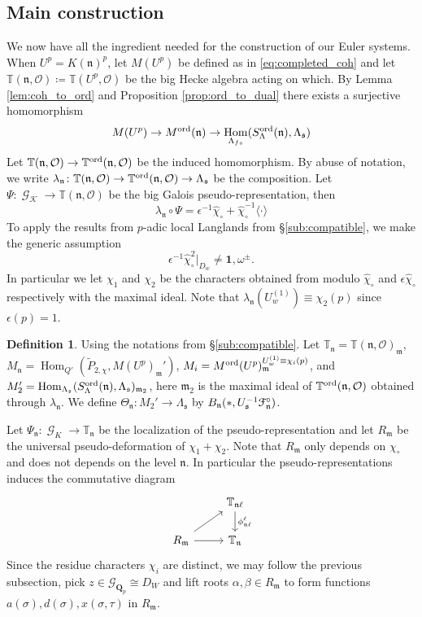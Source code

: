 \documentclass[leqno]{amsart}
\theoremstyle{definition}
\newtheorem{defn}[thm]{Definition}
\theoremstyle{remark}
\newcommand{\id}{\mathbf{1}}
\newcommand{\oo}{\mathcal{O}}
\newcommand{\Qp}{\mathbf{Q}_p}
\DeclareMathOperator{\Hom}{Hom}
\DeclareMathOperator{\Gal}{\mathcal{G}}
\newcommand{\fm}{\mathfrak{m}}
\newcommand{\fn}{\mathfrak{n}}
\newcommand{\fs}{\mathfrak{s}}
\newcommand{\Gp}{\mathcal{G}_{\Qp}} %
\newcommand{\K}{{\mathcal{K}}} %
\newcommand{\TT}{\mathbb{T}} %
\newcommand{\euF}{\EuScript{F}} %
\newcommand{\ord}{\textnormal{ord}} %
\begin{document}
\subsection{Main construction}
We now have all the ingredient needed 
for the construction of our Euler systems.
When $U^p=K(\fn)^p$,
let $M(U^p)$ be defined as in \eqref{eq:completed_coh}
and let $\TT(\fn,\oo)\coloneqq \TT(U^p,\oo)$
be the big Hecke algebra acting on which.
By Lemma \ref{lem:coh_to_ord}
and Proposition \ref{prop:ord_to_dual}
there exists a surjective homomorphism
\[
	M(U^p)\to M^{\ord}(\fn)\to 
	\Hom_{\Lambda_{fs}}(S_\Lambda^{\ord}(\fn),\Lambda_\fs)
\]
Let $\TT(\fn,\oo)\to \TT^{\ord}(\fn,\oo)$
be the induced homomorphism.
By abuse of notation, we write 
$\lambda_{\fn}\colon \TT(\fn,\oo)\to \TT^{\ord}(\fn,\oo)\to
\Lambda_{\fs}$ be the composition.
Let $\Psi\colon \Gal_\K\to \TT(\fn,\oo)$ be the 
big Galois pseudo-representation, then
\[
	\lambda_{\fn}\circ \Psi=
	\epsilon^{-1}\hat{\chi}_\circ+
	\hat{\chi}_\circ^{-1}\langle\cdot\rangle
\]
To apply the results from $p$-adic local Langlands
from \S\ref{sub:compatible},
we make the generic assumption
\begin{equation}\label{cond:chi_gen}\tag{$\chi$-gen}
\epsilon^{-1}\hat{\chi}_\circ^{2}\vert_{D_w}\neq
\id, \omega^{\pm}.
\end{equation}
In particular we let 
$\chi_1$ and  $\chi_2$ be the 
characters obtained from 
modulo 
$\hat{\chi}_\circ$ and $\epsilon\hat{\chi}_\circ$ 
respectively with the maximal ideal.
Note that $\lambda_{\fn}(U_{w}^{(1)})\equiv \chi_2(p)$
since $\epsilon(p)=1$.


\begin{defn}
	Using the notations from 
	\S\ref{sub:compatible}.
	Let $\TT_\fn=\TT(\fn,\oo)_\fm$,
	$M_\fn=\Hom_{Q'}(\tilde{P}_{2,\chi},M(U^p)_{\fm}')$,
	$M_i=M^{\ord}(U^p)_\fm^{U_{w}^{(1)}\equiv\chi_i(p)}$,
	and $M_2'=\Hom_{\Lambda_{\fs}}
	(S^{\ord}_{\Lambda}(\fn),\Lambda_{\fs})_{\fm_2}$,
	here $\fm_2$ is the maximal ideal
	of $\TT^{\ord}(\fn,\oo)$ obtained through 
	$\lambda_\fn$.
	We define 
	$\Theta_\fn\colon M_2'\to \Lambda_{\fs}$
	by $B_\fn(*,U_\fs^{-1}\euF^\circ_\fn)$.
\end{defn}


Let $\Psi_{\fn}\colon \Gal_K\to \TT_\fn$ be the localization
of the pseudo-representation
and let $R_{\fm}$ be the universal 
pseudo-deformation of $\chi_1+\chi_2$.
Note that  $R_\fm$ only depends on  $\chi_\circ$
and does not depends on the level  $\fn$.
In particular the pseudo-representations induces
the commutative diagram
\[
\begin{tikzcd}
	& \TT_{\fn\ell}\arrow[d,"\phi_{\fn\ell}^\ell"]\\
	R_{\fm}\arrow[r]\arrow[ur]
	& \TT_{\fn}
\end{tikzcd}
\]
Since the residue characters $\chi_i$ are distinct,
we may follow the previous subsection,
pick  $z\in \Gp\cong D_W$ 
and lift roots $\alpha,\beta\in R_\fm$
to form functions  $a(\sigma), d(\sigma), x(\sigma,\tau)$
in  $R_\fm$.
\end{document}
